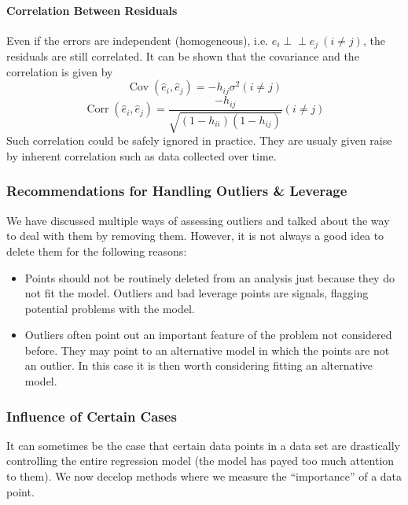 \documentclass[11pt]{article}
\newcommand{\independent}{\perp \!\!\! \perp}
\begin{document}
\paragraph{Correlation Between Residuals} Even if the errors are independent (homogeneous), i.e. $e_i \independent e_j~(i \neq j)$, the residuals are still correlated. It can be shown that the covariance and the correlation is given by
\begin{equation*}
    \operatorname{Cov}\left(\hat{e}_{i}, \hat{e}_{j}\right)=-h_{i j} \sigma^{2}(i \neq j)
\end{equation*}
\begin{equation*}
    \operatorname{Corr}\left(\hat{e}_{i}, \hat{e}_{j}\right)=\frac{-h_{i j}}{\sqrt{\left(1-h_{i i}\right)\left(1-h_{i j}\right)}}(i \neq j)
\end{equation*}
Such correlation could be safely ignored in practice. They are usualy given raise by inherent correlation such as data collected over time.

\subsubsection{Recommendations for Handling Outliers \& Leverage}
We have discussed multiple ways of assessing outliers and talked about the way to deal with them by removing them. However, it is not always a good idea to delete them for the following reasons:
\begin{itemize}
    \item Points should not be routinely deleted from an analysis just because they do not fit the model. Outliers and bad leverage points are signals, flagging potential problems with the model.
    \item Outliers often point out an important feature of the problem not considered before. They may point to an alternative model in which the points are not an outlier. In this case it is then worth considering fitting an alternative model. 
\end{itemize}

\subsubsection{Influence of Certain Cases}
It can sometimes be the case that certain data points in a data set are drastically controlling the entire regression model (the model has payed too much attention to them). We now decelop methods where we measure the ``importance'' of a data point.
\end{document}
